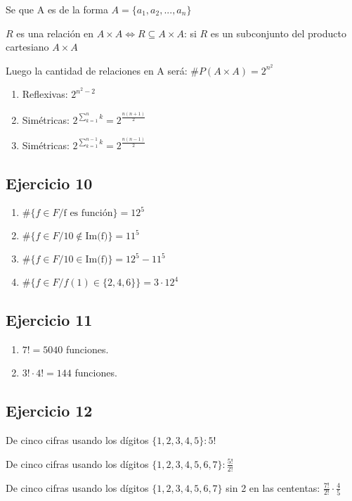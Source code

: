 Se que A es de la forma $ A = \{ a_1, a_2, ... , a_n \} $

$R$ es una relación en $ A \times A \iff R \subseteq A \times A $: si $R$ es un subconjunto del producto cartesiano $ A \times A $

Luego la cantidad de relaciones en A será: $ \# P(A \times A) = 2^{n^2}$

\begin{enumerate}
    \item Reflexivas: $ 2^{n^2-2} $
    \item Simétricas: $ 2^{\sum_{k =1}^{n}k} = 2^{\frac{n(n+1)}{2}} $
    \item Simétricas: $ 2^{\sum_{k =1}^{n-1}k} = 2^{\frac{n(n-1)}{2}} $
\end{enumerate}

\subsection{Ejercicio 10}
\begin{enumerate}
    \item $ \#\{ f \in F / \text{f es función}\} = 12^5 $
    \item $ \#\{ f \in F / 10 \not \in \text{Im(f)} \} = 11^5 $
    \item $ \#\{ f \in F / 10 \in \text{Im(f)} \} = 12^5 - 11^5 $
    \item $ \#\{ f \in F / f(1) \in \{ 2,4,6 \} \} = 3 \cdot 12^4 $
\end{enumerate}

\subsection{Ejercicio 11}

\begin{enumerate}
    \item $7! = 5040$ funciones.
    \item $3! \cdot 4! = 144$ funciones.
\end{enumerate}

\subsection{Ejercicio 12}
De cinco cifras usando los dígitos $\{ 1,2,3,4,5 \}: 5!$

De cinco cifras usando los dígitos $\{ 1,2,3,4,5,6,7 \}: \frac{5!}{2!}$

De cinco cifras usando los dígitos $\{ 1,2,3,4,5,6,7 \}$ sin 2 en las cententas: $\frac{7!}{2!} \cdot \frac{4}{5}$

